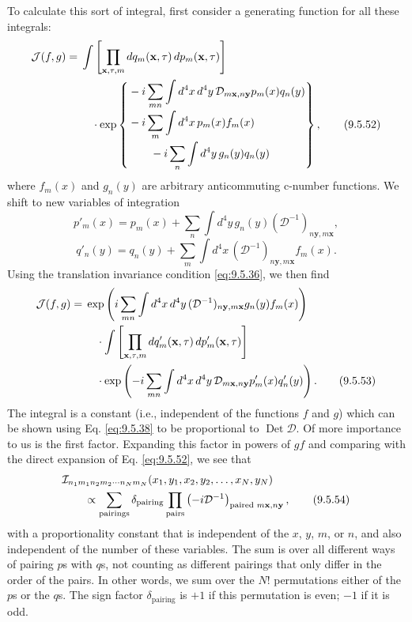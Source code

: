 To calculate this sort of integral, first consider a generating function for
all these integrals:
\begin{align}
\mathcal{J}(f,g)
={}&\int\left[\prod_{\mathbf{x},\tau,m}
 dq_m(\mathbf{x},\tau)\,dp_m(\mathbf{x},\tau)\right]
\notag\\
&\quad\cdot\exp\left\{\begin{aligned}
 &-i\sum_{mn}\int d^4x\,d^4y\,
 \mathcal{D}_{m\mathbf{x},n\mathbf{y}}p_m(x)q_n(y)\\[-2pt]
&-i\sum_m\int d^4x\,p_m(x)f_m(x)\\[-2pt]
&\qquad{}-i\sum_n\int d^4y\,g_n(y)q_n(y)
 \end{aligned}\right\},
\tag{9.5.52}\label{eq:9.5.52}
\end{align}
where $f_m(x)$ and $g_n(y)$ are arbitrary anticommuting c-number functions.
We shift to new variables of integration
\[
p'_m(x)=p_m(x)+\sum_n\int d^4y\,
 g_n(y)(\mathcal{D}^{-1})_{n\mathbf{y},m\mathbf{x}},
\]
\[
q'_n(y)=q_n(y)+\sum_m\int d^4x\,
 (\mathcal{D}^{-1})_{n\mathbf{y},m\mathbf{x}}f_m(x).
\]
Using the translation invariance condition \eqref{eq:9.5.36}, we then find
\begin{align}
\mathcal{J}(f,g)
={}&\exp\left(i\sum_{mn}\int d^4x\,d^4y\,
 (\mathcal{D}^{-1})_{n\mathbf{y},m\mathbf{x}}g_n(y)f_m(x)\right)
\notag\\
&\quad\cdot\int\left[\prod_{\mathbf{x},\tau,m}
 dq'_m(\mathbf{x},\tau)\,dp'_m(\mathbf{x},\tau)\right]
\notag\\
&\quad\cdot\exp\left(-i\sum_{mn}\int d^4x\,d^4y\,
 \mathcal{D}_{m\mathbf{x},n\mathbf{y}}p'_m(x)q'_n(y)\right).
\tag{9.5.53}\label{eq:9.5.53}
\end{align}
The integral is a constant (i.e., independent of the functions $f$ and $g$)
which can be shown using Eq. \eqref{eq:9.5.38} to be proportional to
$\operatorname{Det}\mathcal{D}$. Of more importance to us is the first factor.
Expanding this factor in powers of $gf$ and comparing with the direct expansion
of Eq. \eqref{eq:9.5.52}, we see that
\begin{align}
&\mathcal{I}_{n_1m_1n_2m_2\cdots n_Nm_N}
 (x_1,y_1,x_2,y_2,\ldots,x_N,y_N)
\notag\\
&\qquad\propto\sum_{\text{pairings}}\delta_{\text{pairing}}
 \prod_{\text{pairs}}
 \left(-i\mathcal{D}^{-1}\right)_{\text{paired }m\mathbf{x},n\mathbf{y}},
\tag{9.5.54}\label{eq:9.5.54}
\end{align}
with a proportionality constant that is independent of the $x$, $y$, $m$, or
$n$, and also independent of the number of these variables. The sum is over
all different ways of pairing $p$s with $q$s, not counting as different
pairings that only differ in the order of the pairs. In other words, we sum
over the $N!$ permutations either of the $p$s or the $q$s. The sign factor
$\delta_{\text{pairing}}$ is $+1$ if this permutation is even; $-1$ if it is
odd.

